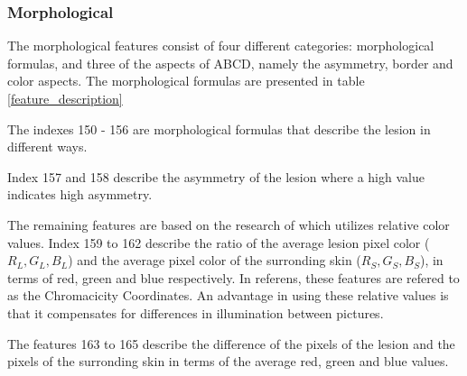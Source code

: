 \documentclass{kththesis}
\begin{document}
  
  \subsubsection{Morphological} %
  
  The morphological features consist of four different categories: morphological formulas, and three of the aspects of ABCD, namely the asymmetry, border and color aspects.
  The morphological formulas are presented in table \ref{feature_description}
  
  The indexes 150 - 156 are morphological formulas that describe the lesion in different ways. %

  
  Index 157 and 158 describe the asymmetry of the lesion where a high value indicates high asymmetry.

  The remaining features are based on the research of \parencite{celebi2008automatic} which utilizes relative color values. Index 159 to 162 describe the ratio of the average lesion pixel color (\(R_L, G_L, B_L\)) and the average pixel color of the surronding skin (\(R_S, G_S, B_S\)), in terms of red, green and blue respectively. In referens, these features are refered to as the Chromacicity Coordinates. An advantage in using these relative values is that it compensates for differences in illumination between pictures. 

  The features 163 to 165 describe the difference of the pixels of the lesion and the pixels of the surronding skin in terms of the average red, green and blue values.
\end{document}
